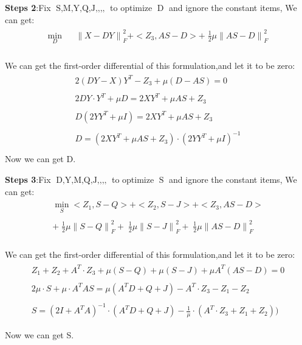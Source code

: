 \documentclass{article}
\begin{document}
\begin{flushleft}
\textbf{Steps 2}:\;\;Fix $\mathop{S,M,Y,Q,J,Z_1,Z_2,Z_3,Z_4}$ to optimize $\mathop{D}$ and ignore the constant items, We can get:
\begin{eqnarray}
\begin{array}{lll}
    \mathop{\min}\limits_{D} && {\parallel X - DY\parallel}_F^2 + <Z_3,AS-D>  +\; \frac{1}{2}\mu{\parallel AS - D \parallel}_F^2
\end{array}
\end{eqnarray}\\
We can get the first-order differential of this formulation,and let it to be zero:
\begin{eqnarray}
\begin{array}{lll}
    2(DY - X)Y^T  - Z_3 + \mu (D-AS) = 0 \nonumber \\\\
    2DY\cdot Y^T + \mu D = 2XY^T + \mu AS +Z_3\\\\
    D(2 YY^T +\mu I) = 2XY^T + \mu AS + Z_3\\\\
    D = (2XY^T + \mu AS +Z_3) \cdot (2YY^T +\mu I)^{-1}\\
\end{array}
\end{eqnarray}
Now we can get D.\\
\end{flushleft}

\begin{flushleft}
\textbf{Steps 3}:\;\;Fix $\mathop{D,Y,M,Q,J,Z_1,Z_2,Z_3,Z_4}$ to optimize $\mathop{S}$ and ignore the constant items, We can get:
\begin{eqnarray}
\begin{array}{lll}
    \mathop{\min}\limits_{S} <Z_1,S-Q> + <Z_2,S-J> + <Z_3,AS-D> \\\\ +\;\frac{1}{2}\mu{\parallel S - Q\parallel}_F^2 +\;\frac{1}{2}\mu{\parallel S - J \parallel}_F^2
    +\;\frac{1}{2}\mu{\parallel AS - D \parallel}_F^2
\end{array}
\end{eqnarray}\\
We can get the first-order differential of this formulation,and let it to be zero:
\begin{eqnarray}
\begin{array}{lll}
    Z_1 + Z_2 + A^T\cdot Z_3 + \mu(S-Q) + \mu(S-J) +\mu A^T(AS-D) = 0 \nonumber \\\\
    2\mu \cdot S+ \mu\cdot A^T AS = \mu (A^TD+Q+J) - A^T\cdot Z_3 -Z_1-Z_2\\\\
    S = (2I+A^TA)^{-1} \cdot (A^TD + Q +J) - \frac{1}{\mu} \cdot  (A^T \cdot Z_3+Z_1 +Z_2))\\\\
\end{array}
\end{eqnarray}
Now we can get S.\\
\end{flushleft}
\end{document}
